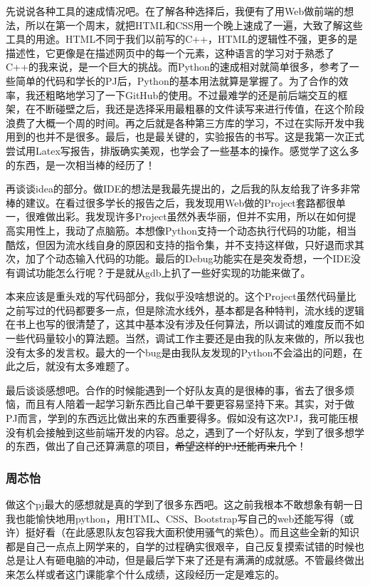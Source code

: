 \documentclass[12pt]{article} %
\begin{document}
\begin{sloppypar}
先说说各种工具的速成情况吧。在了解各种选择后，我便有了用Web做前端的想法，所以在第一个周末，就把HTML和CSS用一个晚上速成了一遍，大致了解这些工具的用途。HTML不同于我们以前写的C++，HTML的逻辑性不强，更多的是描述性，它更像是在描述网页中的每一个元素，这种语言的学习对于熟悉了C++的我来说，是一个巨大的挑战。而Python的速成相对就简单很多，参考了一些简单的代码和学长的PJ后，Python的基本用法就算是掌握了。为了合作的效率，我还粗略地学习了一下GitHub的使用。不过最难学的还是前后端交互的框架，在不断碰壁之后，我还是选择采用最粗暴的文件读写来进行传值，在这个阶段浪费了大概一个周的时间。再之后就是各种第三方库的学习，不过在实际开发中我用到的也并不是很多。最后，也是最关键的，实验报告的书写。这是我第一次正式尝试用Latex写报告，排版确实美观，也学会了一些基本的操作。感觉学了这么多的东西，是一次相当棒的经历了！

再谈谈idea的部分。做IDE的想法是我最先提出的，之后我的队友给我了许多非常棒的建议。在看过很多学长的报告之后，我发现用Web做的Project套路都很单一，很难做出彩。我发现许多Project虽然外表华丽，但并不实用，所以在如何提高实用性上，我动了点脑筋。本想像Python支持一个动态执行代码的功能，相当酷炫，但因为流水线自身的原因和支持的指令集，并不支持这样做，只好退而求其次，加了个动态输入代码的功能。最后的Debug功能实在是突发奇想，一个IDE没有调试功能怎么行呢？于是就从gdb上扒了一些好实现的功能来做了。

本来应该是重头戏的写代码部分，我似乎没啥想说的。这个Project虽然代码量比之前写过的代码都要多一点，但是除流水线外，基本都是各种特判，流水线的逻辑在书上也写的很清楚了，这其中基本没有涉及任何算法，所以调试的难度反而不如一些代码量较小的算法题。当然，调试工作主要还是由我的队友来做的，所以我也没有太多的发言权。最大的一个bug是由我队友发现的Python不会溢出的问题，在此之后，就没有太多难题了。

最后谈谈感想吧。合作的时候能遇到一个好队友真的是很棒的事，省去了很多烦恼，而且有人陪着一起学习新东西比自己单干要更容易坚持下来。其实，对于做PJ而言，学到的东西远比做出来的东西重要得多。假如没有这次PJ，我可能压根没有机会接触到这些前端开发的内容。总之，遇到了一个好队友，学到了很多想学的东西，做出了自己还算满意的项目，\sout{希望这样的PJ还能再来几个}！

\subsubsection{周芯怡} 

做这个pj最大的感想就是真的学到了很多东西吧。这之前我根本不敢想象有朝一日我也能愉快地用python，用HTML、CSS、Bootstrap写自己的web还能写得（或许）挺好看（在此感恩队友包容我大面积使用骚气的紫色）。而且这些全新的知识都是自己一点点上网学来的，自学的过程确实很艰辛，自己反复摸索试错的时候也总是让人有砸电脑的冲动，但是最后学下来了还是有满满的成就感。不管最终做出来怎么样或者这门课能拿个什么成绩，这段经历一定是难忘的。


\end{sloppypar}
\end{document}
